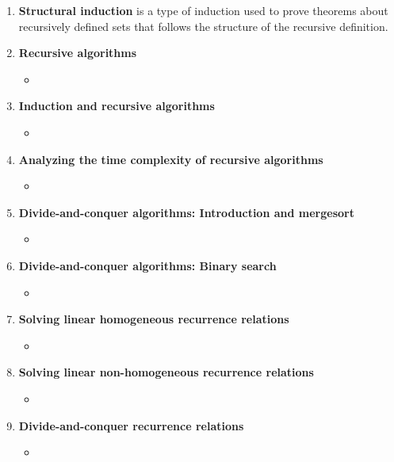 \documentclass[12pt,a4paper]{article}
\begin{document}
\begin{enumerate}
  \item \textbf{Structural induction} is a type of induction used to prove theorems about recursively defined sets that follows the structure of the recursive definition.
  \item \textbf{Recursive algorithms}
  \begin{itemize}
    \item 
  \end{itemize}
  \item \textbf{Induction and recursive algorithms}
  \begin{itemize}
    \item 
  \end{itemize}
  \item \textbf{Analyzing the time complexity of recursive algorithms}
  \begin{itemize}
    \item 
  \end{itemize}
  \item \textbf{Divide-and-conquer algorithms: Introduction and mergesort}
  \begin{itemize}
    \item 
  \end{itemize}
  \item \textbf{Divide-and-conquer algorithms: Binary search}
  \begin{itemize}
    \item 
  \end{itemize}
  \item \textbf{Solving linear homogeneous recurrence relations}
  \begin{itemize}
    \item 
  \end{itemize}
  \item \textbf{Solving linear non-homogeneous recurrence relations}
  \begin{itemize}
    \item 
  \end{itemize}
  \item \textbf{Divide-and-conquer recurrence relations}
  \begin{itemize}
    \item 
  \end{itemize}
\end{enumerate}
\end{document}
